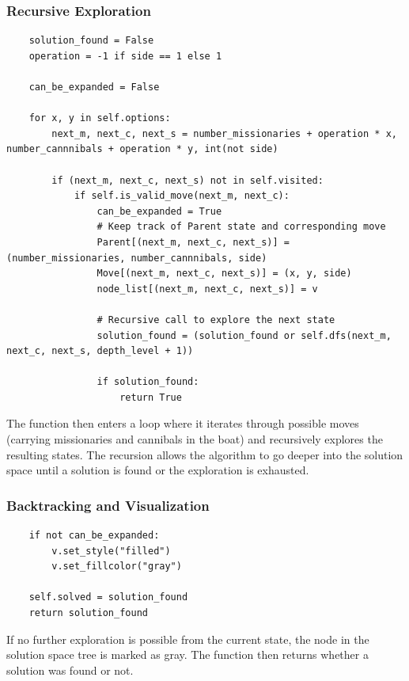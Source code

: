 \documentclass[12pt]{article}
\begin{document}
\subsubsection*{Recursive Exploration}
\begin{verbatim}
    solution_found = False
    operation = -1 if side == 1 else 1

    can_be_expanded = False

    for x, y in self.options:
        next_m, next_c, next_s = number_missionaries + operation * x, number_cannnibals + operation * y, int(not side)

        if (next_m, next_c, next_s) not in self.visited:
            if self.is_valid_move(next_m, next_c):
                can_be_expanded = True
                # Keep track of Parent state and corresponding move
                Parent[(next_m, next_c, next_s)] = (number_missionaries, number_cannnibals, side)
                Move[(next_m, next_c, next_s)] = (x, y, side)
                node_list[(next_m, next_c, next_s)] = v

                # Recursive call to explore the next state
                solution_found = (solution_found or self.dfs(next_m, next_c, next_s, depth_level + 1))
            
                if solution_found:
                    return True
\end{verbatim}
    \vspace*{5mm}
The function then enters a loop where it iterates through possible moves (carrying missionaries and cannibals in the boat) and recursively explores the resulting states. The recursion allows the algorithm to go deeper into the solution space until a solution is found or the exploration is exhausted.

\subsubsection*{Backtracking and Visualization}
\begin{verbatim}
    if not can_be_expanded:
        v.set_style("filled")
        v.set_fillcolor("gray")

    self.solved = solution_found
    return solution_found
\end{verbatim}
    \vspace*{5mm}
If no further exploration is possible from the current state, the node in the solution space tree is marked as gray. The function then returns whether a solution was found or not.
\end{document}
